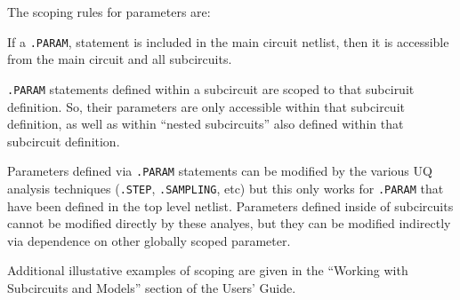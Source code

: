 \begin{Command}
The scoping rules for parameters are:
\begin{XyceItemize}
\item If a \texttt{.PARAM}, statement is included in the main circuit 
netlist, then it is accessible from the main circuit and all subcircuits. 
\item \texttt{.PARAM} statements defined within a subcircuit are scoped 
to that subciruit definition.  So, their parameters are only accessible within 
that subcircuit definition, as well as within ``nested subcircuits'' also 
defined within that subcircuit definition.
\item Parameters defined via \texttt{.PARAM} statements can be modified by the 
  various UQ analysis techniques (\texttt{.STEP}, \texttt{.SAMPLING}, etc) but
  this only works for \texttt{.PARAM} that have been defined in the top level netlist.
  Parameters defined inside of subcircuits cannot be modified directly 
  by these analyes, but they can be modified indirectly via dependence on other 
  globally scoped parameter.
\end{XyceItemize}

Additional illustative examples of scoping are given in the
``Working with Subcircuits and Models'' section of the \Xyce{} Users' 
Guide\UsersGuide. 

\end{Command}


